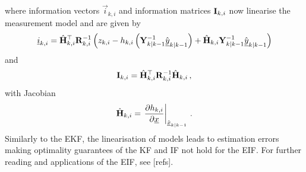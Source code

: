 where information vectors $\vec{i}_{k,i}$ and information matrices ${{\mathbf{I}}}_{k,i}$ now linearise the measurement model and are given by
\begin{equation}\label{eq:prelims:eif_measurement_vec_defn}
    {\underline{i}}_{k,i} = \hat{{{\mathbf{H}}}}_{k,i}^\top{\ensuremath{{\mathbf{R}}}}_{k,i}^{-1}\left(z_{k,i} - h_{k,i}\left({{\mathbf{Y}}}_{k|k-1}^{-1}\hat{{\underline{y}}}_{k|k-1}\right) + \hat{{{\mathbf{H}}}}_{k,i}{{\mathbf{Y}}}_{k|k-1}^{-1}\hat{{\underline{y}}}_{k|k-1}\right)
\end{equation}
and
\begin{equation}\label{eq:prelims:eif_measurement_mat_defn}
    {\ensuremath{{\mathbf{I}}}}_{k,i} = \hat{{{\mathbf{H}}}}_{k,i}^\top{\ensuremath{{\mathbf{R}}}}_{k,i}^{-1}\hat{{{\mathbf{H}}}}_{k,i}\,,
\end{equation}
with Jacobian
\begin{equation}
    \hat{{{\mathbf{H}}}}_{k,i} = \left.\frac{\partial h_{k,i}}{\partial {\underline{x}}}\right|_{\hat{{\underline{x}}}_{k|k-1}}\,.
\end{equation}
Similarly to the EKF, the linearisation of models leads to estimation errors making optimality guarantees of the KF and IF not hold for the EIF. For further reading and applications of the EIF, see [refs].

% 
% 

